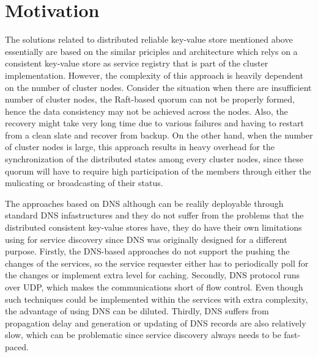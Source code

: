 \section{Motivation}
\label{motivation}



The solutions related to distributed reliable key-value store\cite{etcd,Consul,Synapse,zookeeper} mentioned above essentially are based on the similar priciples and architecture which relys on a consistent key-value store as service registry that is part of the cluster implementation. However, the complexity of this approach is heavily dependent on the number of cluster nodes. Consider the situation when there are insufficient number of cluster nodes, the Raft-based\cite{raft} quorum can not be properly formed, hence the data consistency may not be achieved across the nodes. Also, the recovery might take very long time due to various failures and having to restart from a clean slate and recover from backup. On the other hand, when the number of cluster nodes is large, this approach results in heavy overhead for the synchronization of the distributed states among every cluster nodes, since these quorum will have to require high participation of the members through either the mulicating or broadcasting of their status.

The approaches based on DNS\cite{swarm,compose,mesos} although can be realily deployable through standard DNS infastructures and they do not suffer from the problems that the distributed consistent key-value stores have, they do have their own limitations using for service discovery since DNS was originally designed for a different purpose. Firstly, the DNS-based approaches do not support the pushing the changes of the services, so the service requester either has to periodically poll for the changes or implement extra level for caching. Secondly, DNS protocol runs over UDP, which makes the communications short of flow control. Even though such techniques could be implemented within the services with extra complexity, the advantage of using DNS can be diluted. Thirdly, DNS suffers from propagation delay and generation or updating of DNS records are also relatively slow, which can be problematic since service discovery always needs to be fast-paced. 

